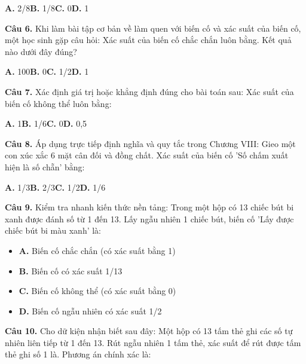 \documentclass[11pt,a4paper]{article}
\begin{document}
\hspace*{1.5em}\textbf{A.} 2/8\quad\quad \textbf{B.} 1/8\quad\quad \textbf{C.} 0\quad\quad \textbf{D.} 1\par\vspace{2pt}
\textbf{\color{primary} Câu 6.} Khi làm bài tập cơ bản về làm quen với biến cố và xác suất của biến cố, một học sinh gặp câu hỏi: Xác suất của biến cố chắc chắn luôn bằng. Kết quả nào dưới đây đúng?\par
\hspace*{1.5em}\textbf{A.} 100\quad\quad \textbf{B.} 0\quad\quad \textbf{C.} 1/2\quad\quad \textbf{D.} 1\par\vspace{2pt}
\textbf{\color{primary} Câu 7.} Xác định giá trị hoặc khẳng định đúng cho bài toán sau: Xác suất của biến cố không thể luôn bằng:\par
\hspace*{1.5em}\textbf{A.} 1\quad\quad \textbf{B.} 1/6\quad\quad \textbf{C.} 0\quad\quad \textbf{D.} 0,5\par\vspace{2pt}
\textbf{\color{primary} Câu 8.} Áp dụng trực tiếp định nghĩa và quy tắc trong Chương VIII: Gieo một con xúc xắc 6 mặt cân đối và đồng chất. Xác suất của biến cố 'Số chấm xuất hiện là số chẵn' bằng:\par
\hspace*{1.5em}\textbf{A.} 1/3\quad\quad \textbf{B.} 2/3\quad\quad \textbf{C.} 1/2\quad\quad \textbf{D.} 1/6\par\vspace{2pt}
\textbf{\color{primary} Câu 9.} Kiểm tra nhanh kiến thức nền tảng: Trong một hộp có 13 chiếc bút bi xanh được đánh số từ 1 đến 13. Lấy ngẫu nhiên 1 chiếc bút, biến cố 'Lấy được chiếc bút bi màu xanh' là:\par
\begin{itemize}\setlength{\itemsep}{1pt}\setlength{\parskip}{0pt}
  \item[] \textbf{A.} Biến cố chắc chắn (có xác suất bằng 1)
  \item[] \textbf{B.} Biến cố có xác suất 1/13
  \item[] \textbf{C.} Biến cố không thể (có xác suất bằng 0)
  \item[] \textbf{D.} Biến cố ngẫu nhiên có xác suất 1/2
\end{itemize}\vspace{2pt}
\textbf{\color{primary} Câu 10.} Cho dữ kiện nhận biết sau đây: Một hộp có 13 tấm thẻ ghi các số tự nhiên liên tiếp từ 1 đến 13. Rút ngẫu nhiên 1 tấm thẻ, xác suất để rút được tấm thẻ ghi số 1 là. Phương án chính xác là:\par
\end{document}
